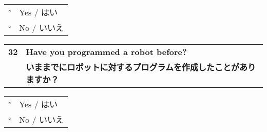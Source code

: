 \begin{Form}
\begin{tabular}{rl}
\quad $\square$ & Yes / はい \\
\quad $\square$ & No /  いいえ \\
\end{tabular}
\vspace{.1in}

\vspace{.05in}
\begin{tabular}{rl}
\textbf{32} & \textbf{Have you programmed a robot before?}\\
{} & \textbf{いままでにロボットに対するプログラムを作成したことがありますか？}\\
\end{tabular}

\begin{tabular}{rl}
\quad $\square$ & Yes / はい \\
\quad $\square$ & No /  いいえ \\
\end{tabular}
\vspace{.1in}
\end{Form}